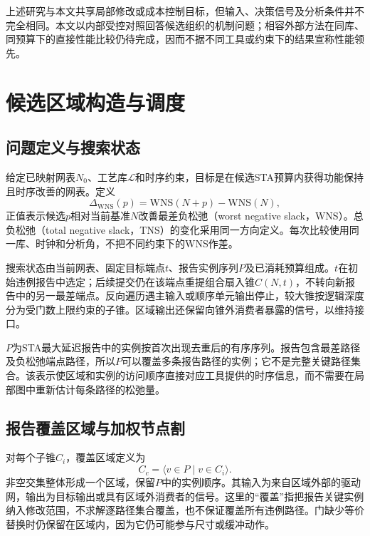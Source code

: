 \documentclass[twocolumn,10pt,fontset=windows]{ctexart}
\begin{document}
上述研究与本文共享局部修改或成本控制目标，但输入、决策信号及分析条件并不完全相同。本文以内部受控对照回答候选组织的机制问题；相容外部方法在同库、同预算下的直接性能比较仍待完成，因而不据不同工具或约束下的结果宣称性能领先。

\section{候选区域构造与调度}

\subsection{问题定义与搜索状态}

给定已映射网表$N_0$、工艺库$\mathcal L$和时序约束，目标是在候选STA预算内获得功能保持且时序改善的网表。定义
\begin{equation}\label{eq:gain}
\Delta_{\mathrm{WNS}}(p)=\mathrm{WNS}(N+p)-\mathrm{WNS}(N),
\end{equation}
正值表示候选$p$相对当前基准$N$改善最差负松弛（worst negative slack，WNS）。总负松弛（total negative slack，TNS）的变化采用同一方向定义。每次比较使用同一库、时钟和分析角，不把不同约束下的WNS作差。

搜索状态由当前网表、固定目标端点$t$、报告实例序列$P$及已消耗预算组成。$t$在初始违例报告中选定；后续提交仍在该端点重提组合扇入锥$C(N,t)$，不转向新报告中的另一最差端点。反向遍历遇主输入或顺序单元输出停止，较大锥按逻辑深度分为受门数上限约束的子锥。区域输出还保留向锥外消费者暴露的信号，以维持接口。

$P$为STA最大延迟报告中的实例按首次出现去重后的有序序列。报告包含最差路径及负松弛端点路径，所以$P$可以覆盖多条报告路径的实例；它不是完整关键路径集合。该表示使区域和实例的访问顺序直接对应工具提供的时序信息，而不需要在局部图中重新估计每条路径的松弛量。

\subsection{报告覆盖区域与加权节点割}\label{sec:regions}

对每个子锥$C_i$，覆盖区域定义为
\begin{equation}\label{eq:cover_region}
C_c=\langle v\in P\mid v\in C_i\rangle.
\end{equation}
非空交集整体形成一个区域，保留$P$中的实例顺序。其输入为来自区域外部的驱动网，输出为目标输出或具有区域外消费者的信号。这里的“覆盖”指把报告关键实例纳入修改范围，不求解逐路径集合覆盖，也不保证覆盖所有违例路径。门缺少等价替换时仍保留在区域内，因为它仍可能参与尺寸或缓冲动作。
\end{document}
